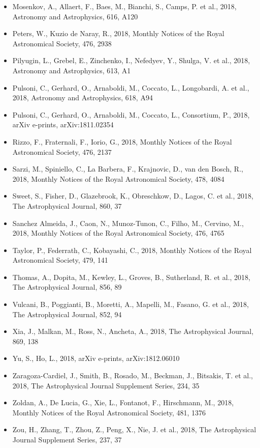 \documentclass{letter}
\begin{document}
\begin{enumerate}
\begin{itemize}
\item Mosenkov, A., Allaert, F., Baes, M., Bianchi, S., Camps, P. et al., 2018, Astronomy and Astrophysics, 616, A120
\item Peters, W., Kuzio de Naray, R., 2018, Monthly Notices of the Royal Astronomical Society, 476, 2938
\item Pilyugin, L., Grebel, E., Zinchenko, I., Nefedyev, Y., Shulga, V. et al., 2018, Astronomy and Astrophysics, 613, A1
\item Pulsoni, C., Gerhard, O., Arnaboldi, M., Coccato, L., Longobardi, A. et al., 2018, Astronomy and Astrophysics, 618, A94
\item Pulsoni, C., Gerhard, O., Arnaboldi, M., Coccato, L., Consortium, P., 2018, arXiv e-prints, arXiv:1811.02354
\item Rizzo, F., Fraternali, F., Iorio, G., 2018, Monthly Notices of the Royal Astronomical Society, 476, 2137
\item Sarzi, M., Spiniello, C., La Barbera, F., Krajnovic, D., van den Bosch, R., 2018, Monthly Notices of the Royal Astronomical Society, 478, 4084
\item Sweet, S., Fisher, D., Glazebrook, K., Obreschkow, D., Lagos, C. et al., 2018, The Astrophysical Journal, 860, 37
\item Sanchez Almeida, J., Caon, N., Munoz-Tunon, C., Filho, M., Cervino, M., 2018, Monthly Notices of the Royal Astronomical Society, 476, 4765
\item Taylor, P., Federrath, C., Kobayashi, C., 2018, Monthly Notices of the Royal Astronomical Society, 479, 141
\item Thomas, A., Dopita, M., Kewley, L., Groves, B., Sutherland, R. et al., 2018, The Astrophysical Journal, 856, 89
\item Vulcani, B., Poggianti, B., Moretti, A., Mapelli, M., Fasano, G. et al., 2018, The Astrophysical Journal, 852, 94
\item Xia, J., Malkan, M., Ross, N., Ancheta, A., 2018, The Astrophysical Journal, 869, 138
\item Yu, S., Ho, L., 2018, arXiv e-prints, arXiv:1812.06010
\item Zaragoza-Cardiel, J., Smith, B., Rosado, M., Beckman, J., Bitsakis, T. et al., 2018, The Astrophysical Journal Supplement Series, 234, 35
\item Zoldan, A., De Lucia, G., Xie, L., Fontanot, F., Hirschmann, M., 2018, Monthly Notices of the Royal Astronomical Society, 481, 1376
\item Zou, H., Zhang, T., Zhou, Z., Peng, X., Nie, J. et al., 2018, The Astrophysical Journal Supplement Series, 237, 37

\end{itemize}
\end{enumerate}
\end{document}
